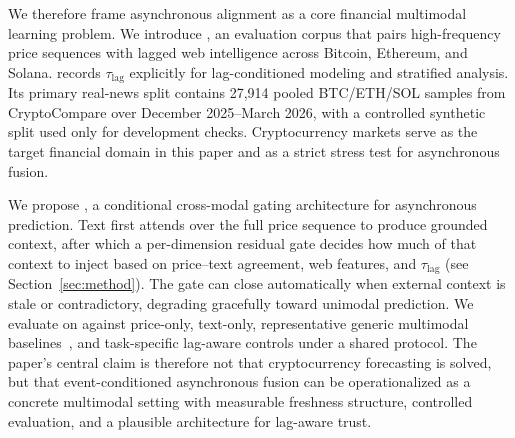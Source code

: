 We therefore frame asynchronous alignment as a core financial multimodal learning problem.
We introduce \dataset{}, an evaluation corpus that pairs high-frequency price sequences with lagged web intelligence across Bitcoin, Ethereum, and Solana.
\dataset{} records $\tau_{\mathrm{lag}}$ explicitly for lag-conditioned modeling and stratified analysis.
Its primary real-news split contains 27{,}914 pooled BTC/ETH/SOL samples from CryptoCompare over December 2025--March 2026, with a controlled synthetic split used only for development checks.
Cryptocurrency markets serve as the target financial domain in this paper and as a strict stress test for asynchronous fusion.

We propose \CGCMA{}, a conditional cross-modal gating architecture for asynchronous prediction.
Text first attends over the full price sequence to produce grounded context, after which a per-dimension residual gate decides how much of that context to inject based on price--text agreement, web features, and $\tau_{\mathrm{lag}}$ (see Section~\ref{sec:method}).
The gate can close automatically when external context is stale or contradictory, degrading gracefully toward unimodal prediction.
We evaluate \CGCMA{} on \dataset{} against price-only, text-only, representative generic multimodal baselines~\cite{xu2018stocknet,tsai2019multimodal,zadeh2017tensor}, and task-specific lag-aware controls under a shared protocol.
The paper's central claim is therefore not that cryptocurrency forecasting is solved, but that event-conditioned asynchronous fusion can be operationalized as a concrete multimodal setting with measurable freshness structure, controlled evaluation, and a plausible architecture for lag-aware trust.

